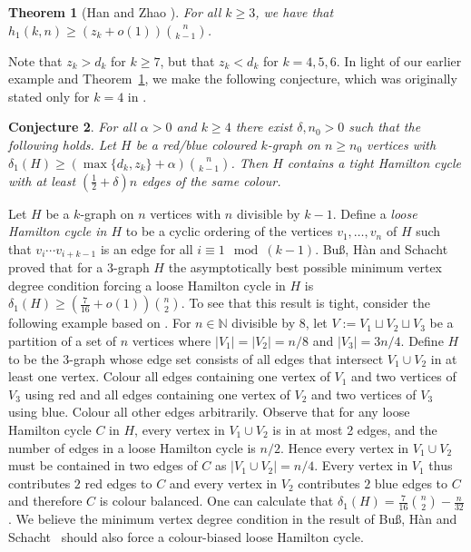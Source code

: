 \documentclass[A4paper,12pt]{article}
\newtheorem{thm}{Theorem}[section]
\newtheorem{conj}[thm]{Conjecture}
\theoremstyle{definition}
\begin{document}
\begin{thm}[Han and Zhao {\cite[Theorem~1.4]{hz16}}]\label{thm:hz}
    For all $k \geq 3$, we have that $h_1(k,n) \geq \left(z_k + o(1) \right)\binom{n}{k-1}$.
\end{thm} 

Note that $z_k > d_k$ for $k \geq 7$, but that $z_k < d_k$ for $k = 4,5,6$. In light of our earlier example and Theorem~\ref{thm:hz}, we make the following conjecture, which was originally stated only for $k=4$ in \cite{color-bias25}.

\begin{conj}\label{conj:new}
    For all $\alpha > 0$ and $k \geq 4$ there exist $\delta, n_0 > 0$ such that the following holds. Let $H$ be a red/blue coloured $k$-graph on $n \geq n_0$ vertices with $\delta_1(H) \geq (\max\{d_k, z_k\} + \alpha)\binom{n}{k-1}$. Then $H$ contains a tight Hamilton cycle with at least $(\frac{1}{2} + \delta)n$ edges of the same colour.  
\end{conj}

Let $H$ be a $k$-graph on $n$ vertices with $n$ divisible by $k-1$. 
Define a \emph{loose Hamilton cycle in $H$} to be a cyclic ordering of the vertices $v_1, \ldots, v_n$ of $H$ such that $v_i\cdots v_{i+k-1}$ is an edge for all $i \equiv 1 \mod (k-1)$.
Bu\ss, H\`{a}n and Schacht~\cite{bhs2013} proved that for a 3-graph $H$ the asymptotically best possible minimum vertex degree condition forcing a loose Hamilton cycle in $H$ is $\delta_1(H) \geq (\frac{7}{16} + o(1))\binom{n}{2}$.
To see that this result is tight, consider the following example based on \cite[Fact~4]{bhs2013}. For $n \in \mathbb{N}$ divisible by 8,
let $V := V_1 \sqcup V_2 \sqcup V_3$ be a partition of a set of $n$ vertices where $|V_1| = |V_2| = n/8$ and $|V_3| = 3n/4$.
Define $H$ to be the 3-graph whose edge set consists of all edges that intersect $V_1 \cup V_2$ in at least one vertex.
Colour all edges containing one vertex of $V_1$ and two vertices of $V_3$ using red and all edges containing one vertex of $V_2$ and two vertices of $V_3$ using blue. 
Colour all other edges arbitrarily.
Observe that for any loose Hamilton cycle $C$ in $H$, every vertex in $V_1 \cup V_2$ is in at most 2 edges, 
and the number of edges in a loose Hamilton cycle is $n/2$. Hence
every vertex in $V_1 \cup V_2$ must be contained in two edges of $C$ as $|V_1 \cup V_2| = n/4$.
Every vertex in $V_1$ thus contributes $2$ red edges to $C$ and every vertex in $V_2$ contributes $2$ blue edges to $C$ and therefore $C$ is colour balanced. 
One can calculate that $\delta_1(H) = \frac{7}{16}\binom{n}{2} - \frac{n}{32}$. 
We believe the minimum vertex degree condition in the result of Bu\ss, H\`{a}n and Schacht~\cite{bhs2013} should also force a colour-biased loose Hamilton cycle.
\end{document}
